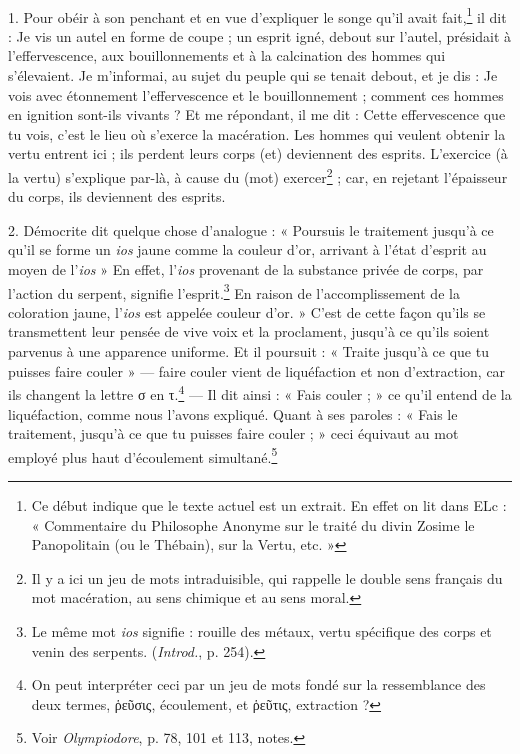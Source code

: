 \documentclass[a4paper, 11pt, oneside, polutonikogreek, french]{article}
\begin{document}
\paragraph{}
1. Pour obéir à son penchant et en vue d'expliquer le songe qu'il avait fait,\footnote{Ce début indique que le texte actuel est un extrait. En effet on lit dans ELc : « Commentaire du Philosophe Anonyme sur le traité du divin Zosime le Panopolitain (ou le Thébain), sur la Vertu, etc. »} il dit : Je vis un autel en forme de coupe ; un esprit igné, debout sur l'autel, présidait à l'effervescence, aux bouillonnements et à la calcination des hommes qui s'élevaient. Je m'informai, au sujet du peuple qui se tenait debout, et je dis : Je vois avec étonnement l'effervescence et le bouillonnement ; comment ces hommes en ignition sont-ils vivants ? Et me répondant, il me dit : Cette effervescence que tu vois, c'est le lieu où s'exerce la macération. Les hommes qui veulent obtenir la vertu entrent ici ; ils perdent leurs corps (et) deviennent des esprits. L'exercice (à la vertu) s'explique par-là, à cause du (mot) exercer\footnote{Il y a ici un jeu de mots intraduisible, qui rappelle le double sens français du mot macération, au sens chimique et au sens moral.} ; car, en rejetant l'épaisseur du corps, ils deviennent des esprits.

2. Démocrite dit quelque chose d'analogue : « Poursuis le traitement jusqu'à ce qu'il se forme un \emph{ios} jaune comme la couleur d'or, arrivant à l'état d'esprit au moyen de l'\emph{ios} » En effet, l'\emph{ios} provenant de la substance privée de corps, par l'action du serpent, signifie l'esprit.\footnote{Le même mot \emph{ios} signifie : rouille des métaux, vertu spécifique des corps et venin des serpents. (\emph{Introd.}, p. 254).} En raison de l'accomplissement de la coloration jaune, l'\emph{ios} est appelée couleur d'or. » C'est de cette façon qu'ils se transmettent leur pensée de vive voix et la proclament, jusqu'à ce qu'ils soient parvenus à une apparence uniforme. Et il poursuit : « Traite jusqu'à ce que tu puisses faire couler » --- faire couler vient de liquéfaction et non d'extraction, car ils changent la lettre σ en τ.\footnote{On peut interpréter ceci par un jeu de mots fondé sur la ressemblance des deux termes, ῥεῦσις, écoulement, et ῥεῦτις, extraction ?} --- Il dit ainsi : « Fais couler ; » ce qu'il entend de la liquéfaction, comme nous l'avons expliqué. Quant à ses paroles : « Fais le traitement, jusqu'à ce que tu puisses faire couler ; » ceci équivaut au mot employé plus haut d'écoulement simultané.\footnote{Voir \emph{Olympiodore}, p. 78, 101 et 113, notes.}
\end{document}
